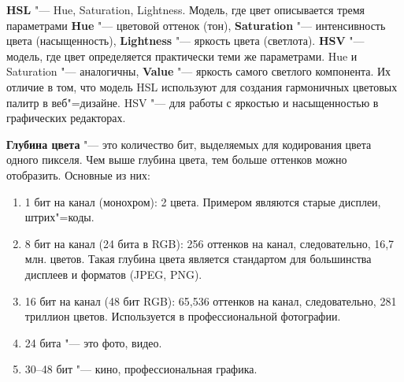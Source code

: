 \textbf{HSL} "--- Hue, Saturation, Lightness. Модель, где цвет описывается тремя параметрами \textbf{Hue} "--- цветовой оттенок (тон), \textbf{Saturation} "--- интенсивность цвета (насыщенность), \textbf{Lightness} "--- яркость цвета (светлота). \textbf{HSV} "--- модель, где цвет определяется практически теми же параметрами. Hue и Saturation "--- аналогичны, \textbf{Value} "--- яркость самого светлого компонента. Их отличие в том, что модель HSL используют для создания гармоничных цветовых палитр в веб"=дизайне. HSV "--- для работы с яркостью и насыщенностью в графических редакторах\cite{vasilev2005cg}.

\textbf{Глубина цвета} "--- это количество бит, выделяемых для кодирования цвета одного пикселя. Чем выше глубина цвета, тем больше оттенков можно отобразить. Основные из них:
\begin{enumerate}
    \item 1 бит на канал (монохром): 2 цвета. Примером являются старые дисплеи, штрих"=коды.
    \item 8 бит на канал (24 бита в RGB): 256 оттенков на канал, следовательно, 16,7 млн. цветов. Такая глубина цвета является стандартом для большинства дисплеев и форматов (JPEG, PNG).
    \item 16 бит на канал (48 бит RGB): 65,536 оттенков на канал, следовательно, 281 триллион цветов. Используется в профессиональной фотографии.
    \item 24 бита "--- это фото, видео.
    \item 30--48 бит "--- кино, профессиональная графика.
\end{enumerate}